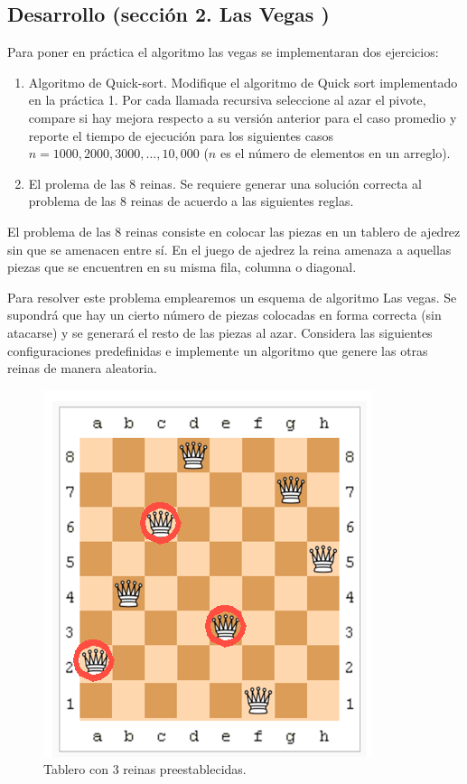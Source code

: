 \documentclass[runningheads,a4paper]{llncs}
\begin{document}
\subsection{Desarrollo (secci\'on 2. Las Vegas )}

Para poner en pr\'actica el algoritmo las vegas se implementaran dos ejercicios:

\begin{enumerate}
	\item Algoritmo de Quick-sort. Modifique el algoritmo de Quick sort implementado en la pr\'actica 1. Por cada llamada recursiva seleccione al azar el pivote, compare si hay mejora respecto  a su versi\'on anterior para el caso promedio y reporte el tiempo de ejecuci\'on para los siguientes casos $n = 1000, 2000, 3000, \ldots, 10,000$ ($n$ es el n\'umero de elementos en un arreglo).
	\item El prolema de las 8 reinas. Se requiere generar una soluci\'on correcta al problema de las 8 reinas de acuerdo a las siguientes reglas.
\end{enumerate}

El problema de las 8 reinas consiste en colocar las piezas en un tablero de ajedrez sin que se amenacen entre s\'i. En el juego de ajedrez la reina amenaza a aquellas piezas que se encuentren en su misma fila, columna o diagonal. 

Para resolver este problema emplearemos un esquema de algoritmo Las vegas. Se supondr\'a que hay un cierto n\'umero de piezas colocadas en forma correcta (sin atacarse) y se generar\'a el resto de las piezas al azar.
Considera las siguientes configuraciones predefinidas e implemente un algoritmo que genere las otras reinas de manera aleatoria.

\begin{figure}[!ht]
\centering
\includegraphics[scale=0.8]{reinas3.png}
\caption{Tablero con 3 reinas preestablecidas.}
\end{figure}
\end{document}
